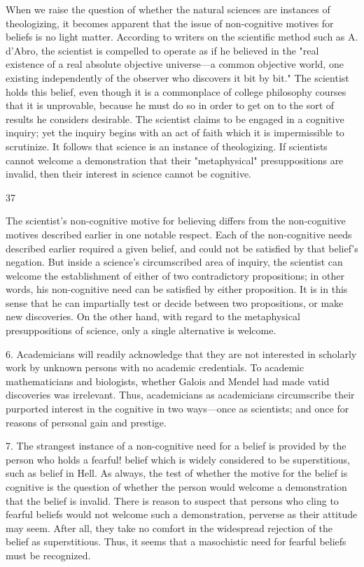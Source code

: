 \documentclass[10pt,twoside]{memoir}
\begin{document}
\begin{enumerate}
{{{{{When we raise the question of whether the natural sciences are 
instances of theologizing, it becomes apparent that the issue of non-cognitive 
motives for beliefs is no light matter. According to writers on the scientific 
method such as A. d'Abro, the scientist is compelled to operate as if he 
believed in the "real existence of a real absolute objective universe---a 
common objective world, one existing independently of the observer who 
discovers it bit by bit." The scientist holds this belief, even though it is a 
commonplace of college philosophy courses that it is unprovable, because he 
must do so in order to get on to the sort of results he considers desirable. 
The scientist claims to be engaged in a cognitive inquiry; yet the inquiry 
begins with an act of faith which it is impermissible to scrutinize. It follows 
that science is an instance of theologizing. If scientists cannot welcome a 
demonstration that their "metaphysical" presuppositions are invalid, then 
their interest in science cannot be cognitive. 


37 


The scientist's non-cognitive motive for believing differs from the 
non-cognitive motives described earlier in one notable respect. Each of the 
non-cognitive needs described earlier required a given belief, and could not 
be satisfied by that belief's negation. But inside a science's circumscribed 
area of inquiry, the scientist can welcome the establishment of either of two 
contradictory propositions; in other words, his non-cognitive need can be 
satisfied by either proposition. It is in this sense that he can impartially test 
or decide between two propositions, or make new discoveries. On the other 
hand, with regard to the metaphysical presuppositions of science, only a 
single alternative is welcome. 

6. Academicians will readily acknowledge that they are not interested 
in scholarly work by unknown persons with no academic credentials. To 
academic mathematicians and biologists, whether Galois and Mendel had 
made vatid discoveries was irrelevant. Thus, academicians as academicians 
circumscribe their purported interest in the cognitive in two ways---once as 
scientists; and once for reasons of personal gain and prestige. 

7. The strangest instance of a non-cognitive need for a belief is 
provided by the person who holds a fearful! belief which is widely considered 
to be superstitious, such as belief in Hell. As always, the test of whether the 
motive for the belief is cognitive is the question of whether the person would 
welcome a demonstration that the belief is invalid. There is reason to suspect 
that persons who cling to fearful beliefs would not welcome such a 
demonstration, perverse as their attitude may seem. After all, they take no 
comfort in the widespread rejection of the belief as superstitious. Thus, it 
seems that a masochistic need for fearful beliefs must be recognized. 

}}}}}
\end{enumerate}
\end{document}

